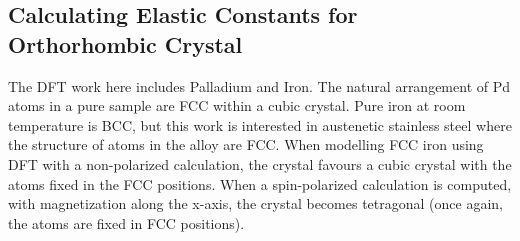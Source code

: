 \documentclass[12pt,twoside]{manual}
\begin{document}
\subsection{Calculating Elastic Constants for Orthorhombic Crystal}


The DFT work here includes Palladium and Iron.  The natural arrangement of Pd atoms in a pure sample are FCC within a cubic crystal.  Pure iron at room temperature is BCC, but this work is interested in austenetic stainless steel where the structure of atoms in the alloy are FCC.  When modelling FCC iron using DFT with a non-polarized calculation, the crystal favours a cubic crystal with the atoms fixed in the FCC positions.  When a spin-polarized calculation is computed, with magnetization along the x-axis, the crystal becomes tetragonal (once again, the atoms are fixed in FCC positions).
\end{document}

